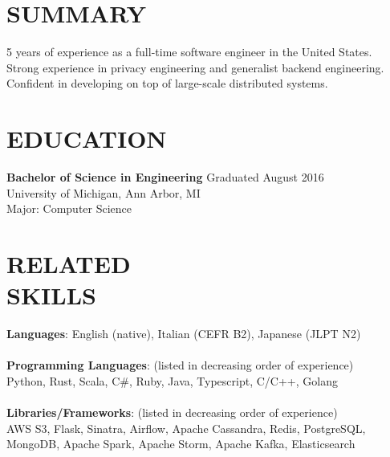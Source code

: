 \documentclass[line,margin]{res}
\begin{document}

\color{HeaderColor}
\address{\hfill adam@riizade.com -- riizade@gmail.com}
\address{\hfill linkedin.com/in/riizade -- github.com/riizade -- 1-248-716-5054}


 \renewcommand{\labelitemi}{$-$}

\begin{resume}
\color{black}
\section{\textcolor{HeaderColor}{SUMMARY}}
                5 years of experience as a full-time software engineer in the United States. \\
				Strong experience in privacy engineering and generalist backend engineering. \\
                Confident in developing on top of large-scale distributed systems. \\

\section{\textcolor{HeaderColor}{EDUCATION}} {\sc \textbf{Bachelor of Science in Engineering}} \hfill Graduated August 2016\\
				University of Michigan, Ann Arbor, MI \\
                Major: Computer Science

\section{\textcolor{HeaderColor}{RELATED \\ SKILLS}}
                {\sc \textbf{Languages}: English (native), Italian (CEFR B2), Japanese (JLPT N2)} \\
                \\
				{\sc \textbf{Programming Languages}: (listed in decreasing order of experience)} \\
				Python, Rust, Scala, C\#, Ruby, Java, Typescript, C/C++, Golang\\
                \\
				{\sc \textbf{Libraries/Frameworks}: (listed in decreasing order of experience)} \\
				AWS S3, Flask, Sinatra, Airflow, Apache Cassandra, Redis, PostgreSQL, MongoDB, Apache Spark, Apache Storm, Apache Kafka, Elasticsearch


\end{resume}
\end{document}
